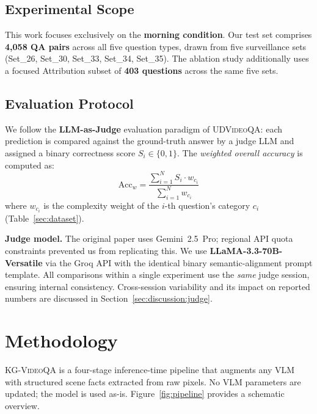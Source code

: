 \documentclass[10pt,conference,compsoc]{IEEEtran}
\newcommand{\ours}{\textsc{KG-VideoQA}}
\newcommand{\dataset}{\textsc{UDVideoQA}}
\begin{document}
\subsection{Experimental Scope}

This work focuses exclusively on the \textbf{morning condition}.
Our test set comprises \textbf{4{,}058 QA pairs} across all five
question types, drawn from five surveillance sets
(Set\_26, Set\_30, Set\_33, Set\_34, Set\_35).
The ablation study additionally uses a focused Attribution
subset of \textbf{403 questions} across the same five sets.

\subsection{Evaluation Protocol}
\label{sec:eval_protocol}

We follow the \textbf{LLM-as-Judge} evaluation paradigm of
\dataset{}: each prediction is compared against the ground-truth
answer by a judge LLM and assigned a binary correctness score
$S_i \in \{0, 1\}$.
The \emph{weighted overall accuracy} is computed as:
\begin{equation}
  \text{Acc}_w = \frac{\displaystyle\sum_{i=1}^{N} S_i \cdot w_{c_i}}
                      {\displaystyle\sum_{i=1}^{N} w_{c_i}}
  \label{eq:weighted_score}
\end{equation}
where $w_{c_i}$ is the complexity weight of the $i$-th question's
category $c_i$ (Table~\ref{sec:dataset}).

\textbf{Judge model.}
The original paper uses Gemini~2.5~Pro; regional API quota
constraints prevented us from replicating this.
We use \textbf{LLaMA-3.3-70B-Versatile} via the Groq API
with the identical binary semantic-alignment prompt template.
All comparisons within a single experiment use the \emph{same}
judge session, ensuring internal consistency.
Cross-session variability and its impact on reported numbers
are discussed in Section~\ref{sec:discussion:judge}.


\section{Methodology}
\label{sec:method}

\ours{} is a four-stage inference-time pipeline that augments
any VLM with structured scene facts extracted from raw pixels.
No VLM parameters are updated; the model is used as-is.
Figure~\ref{fig:pipeline} provides a schematic overview.
\end{document}
